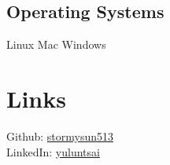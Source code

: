 \documentclass[hidelinks,letterpaper]{deedy-resume} %
\begin{document}
\begin{minipage}[t]{0.35\textwidth}
\sectionspace
\subsection{Operating Systems}
Linux \textbullet{} Mac \textbullet{} Windows

\sectionspace %

\section{Links} 

Github: \href{https://github.com/stormysun513}{stormysun513} \\
LinkedIn: \href{https://linkedin.com/in/yuluntsai}{yuluntsai} \\

\sectionspace %


\end{minipage} %
\hfill
%
%
\end{document}
